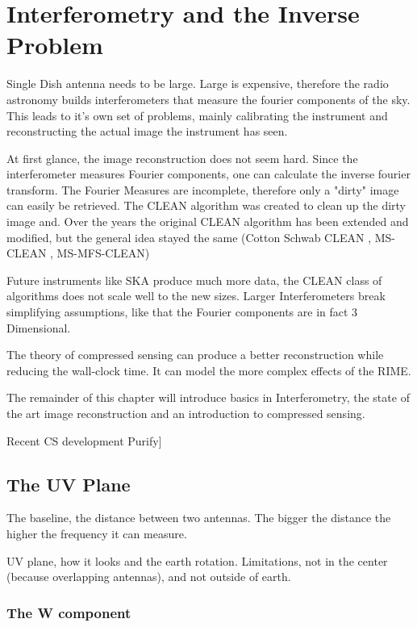 \section{Interferometry and the Inverse Problem}\label{intro}

Single Dish antenna needs to be large. Large is expensive, therefore the radio astronomy builds interferometers that measure the fourier components of the sky. This leads to it's own set of problems, mainly calibrating the instrument and reconstructing the actual image the instrument has seen.

At first glance, the image reconstruction does not seem hard. Since the interferometer measures Fourier components, one can calculate the inverse fourier transform. The Fourier Measures are incomplete, therefore only a "dirty" image can easily be retrieved. The CLEAN \cite{hogbom1974aperture} algorithm was created to clean up the dirty image and. Over the years the original CLEAN algorithm has been extended and modified, but the general idea stayed the same (Cotton Schwab CLEAN \cite{schwab1984relaxing}, MS-CLEAN \cite{rich2008multi}, MS-MFS-CLEAN\cite{rau2011multi})

Future instruments like SKA produce much more data, the CLEAN class of algorithms does not scale well to the new sizes. Larger Interferometers break simplifying assumptions, like that the Fourier components are in fact 3 Dimensional.

The theory of compressed sensing can produce a better reconstruction while reducing the wall-clock time. It can model the more complex effects of the RIME.

The remainder of this chapter will introduce basics in Interferometry, the state of the art image reconstruction and an introduction to compressed sensing.

Recent CS development Purify]

\subsection{The UV Plane}

The baseline, the distance between two antennas. The bigger the distance the higher the frequency it can measure.

UV plane, how it looks and the earth rotation. Limitations, not in the center (because overlapping antennas), and not outside of earth.

\subsubsection{The W component}

